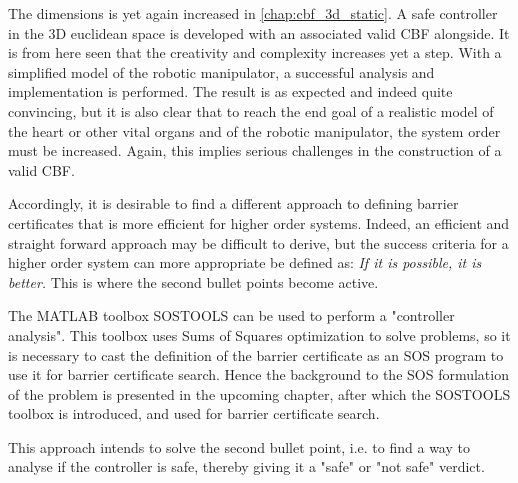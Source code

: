 The dimensions is yet again increased in \autoref{chap:cbf_3d_static}. A safe controller in the 3D euclidean space is developed with an associated valid CBF alongside. It is from here seen that the creativity and complexity increases yet a step. With a simplified model of the robotic manipulator, a successful analysis and implementation is performed. The result is as expected and indeed quite convincing, but it is also clear that to reach the end goal of a realistic model of the heart or other vital organs and of the robotic manipulator, the system order must be increased. Again, this implies serious challenges in the construction of a valid CBF.


Accordingly, it is desirable to find a different approach to defining barrier certificates that is more efficient for higher order systems. Indeed, an efficient and straight forward approach may be difficult to derive, but the success criteria for a higher order system can more appropriate be defined as: \textit{If it is possible, it is better.} This is where the second bullet points become active.

The MATLAB toolbox SOSTOOLS can be used to perform a "controller analysis". This toolbox uses Sums of Squares optimization to solve problems, so it is necessary to cast the definition of the barrier certificate as an SOS program to use it for barrier certificate search. Hence the background to the SOS  formulation of the problem is presented in the upcoming chapter, after which the SOSTOOLS toolbox is introduced, and used for barrier certificate search.

This approach intends to solve the second bullet point, i.e. to find a way to analyse if the controller is safe, thereby giving it a "safe" or "not safe" verdict.